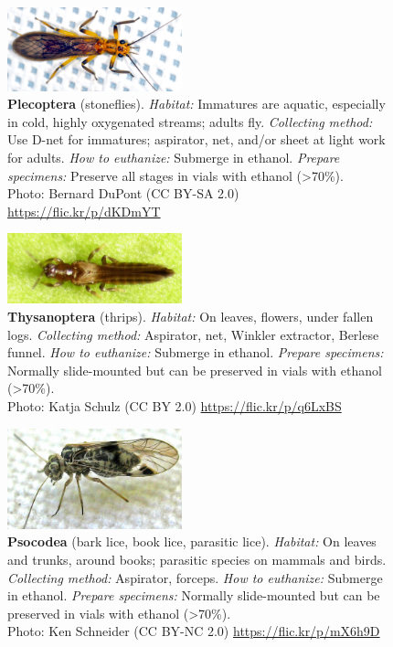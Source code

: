 \documentclass[letterpaper, 11pt]{article}
\begin{document}
\begin{figure}
  \caption{\textbf{Plecoptera} (stoneflies). \textit{Habitat:} Immatures are aquatic, especially in cold, highly oxygenated streams; adults fly. \textit{Collecting method:} Use D-net for immatures; aspirator, net, and/or sheet at light work for adults. \textit{How to euthanize:} Submerge in ethanol. \textit{Prepare specimens:} Preserve all stages in vials with ethanol (\textgreater70\%).\\ Photo: Bernard DuPont (CC BY-SA 2.0) \url{https://flic.kr/p/dKDmYT}}
  \includegraphics[width=0.45\textwidth]{Plecoptera}
\end{figure}

\clearpage

\begin{figure}
  \caption{\textbf{Thysanoptera} (thrips). \textit{Habitat:} On leaves, flowers, under fallen logs. \textit{Collecting method:} Aspirator, net, Winkler extractor, Berlese funnel. \textit{How to euthanize:} Submerge in ethanol. \textit{Prepare specimens:} Normally slide-mounted but can be preserved in vials with ethanol (\textgreater70\%).\\ Photo: Katja Schulz (CC BY 2.0) \url{https://flic.kr/p/q6LxBS}}
  \includegraphics[width=0.45\textwidth]{Thysanoptera}
\end{figure}

\begin{figure}
  \caption{\textbf{Psocodea} (bark lice, book lice, parasitic lice). \textit{Habitat:} On leaves and trunks, around books; parasitic species on mammals and birds. \textit{Collecting method:} Aspirator, forceps. \textit{How to euthanize:} Submerge in ethanol. \textit{Prepare specimens:} Normally slide-mounted but can be preserved in vials with ethanol (\textgreater70\%).\\ Photo: Ken Schneider (CC BY-NC 2.0) \url{https://flic.kr/p/mX6h9D}}
  \includegraphics[width=0.45\textwidth]{PsocodeaBark}
\end{figure}
\end{document}
